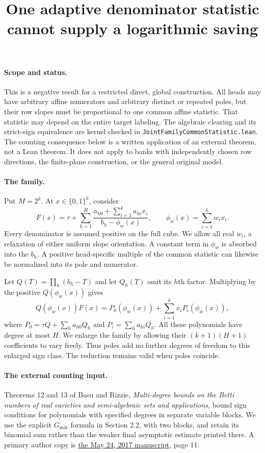 \documentclass{article}
\begin{document}
\title{One adaptive denominator statistic cannot supply a logarithmic saving}
\maketitle

\paragraph{Scope and status.}
This is a negative result for a restricted direct, global construction.
All heads may have arbitrary affine numerators and arbitrary distinct or
repeated poles, but their row slopes must be proportional to one common
affine statistic. That statistic may depend on the entire target labeling.
The algebraic clearing and its strict-sign equivalence are kernel checked
in \texttt{JointFamilyCommonStatistic.lean}. The counting consequence
below is a written application of an external theorem, not a Lean theorem.
It does not apply to banks with independently chosen row directions,
the finite-plane construction, or the general original model.

\paragraph{The family.}
Put $M=2^k$. At $x\in\{0,1\}^k$, consider
\[
 F(x)=\tau+\sum_{h=1}^H
 \frac{a_{h0}+\sum_{i=1}^k a_{hi}x_i}{b_h-\phi_w(x)},
 \qquad \phi_w(x)=\sum_{i=1}^k w_i x_i.
\]
Every denominator is assumed positive on the full cube. We allow all
real $w_i$, a relaxation of either uniform slope orientation. A constant
term in $\phi_w$ is absorbed into the $b_h$. A positive head-specific
multiple of the common statistic can likewise be normalized into its
pole and numerator.

Let $Q(T)=\prod_h(b_h-T)$ and let $Q_h(T)$ omit its $h$th factor.
Multiplying by the positive $Q(\phi_w(x))$ gives
\[
 Q(\phi_w(x))F(x)=P_0(\phi_w(x))+
       \sum_{i=1}^k x_iP_i(\phi_w(x)),
\]
where $P_0=\tau Q+\sum_h a_{h0}Q_h$ and
$P_i=\sum_h a_{hi}Q_h$. All these polynomials have degree at most $H$.
We enlarge the family by allowing their $(k+1)(H+1)$ coefficients to
vary freely. Thus poles add no further degrees of freedom to this
enlarged sign class. The reduction remains valid when poles coincide.

\paragraph{The external counting input.}
Theorems 12 and 13 of Basu and Rizzie,
\emph{Multi-degree bounds on the Betti numbers of real varieties and
semi-algebraic sets and applications}, bound sign conditions for
polynomials with specified degrees in separate variable blocks.
We use the explicit $G_{\min}$ formula in Section 2.2, with two blocks,
and retain its binomial sum rather than the weaker final asymptotic
estimate printed there. A primary author copy is
\href{https://www.math.purdue.edu/~sbasu/multidegree-may-24-2017.pdf}
{the May 24, 2017 manuscript}, page 11.
\end{document}
